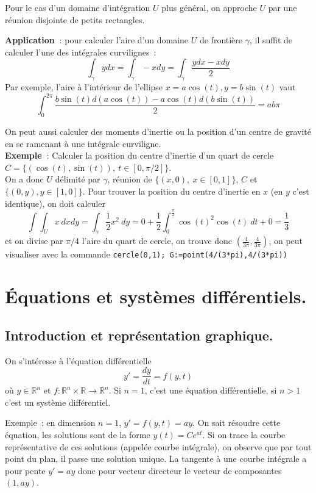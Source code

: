 \documentclass[a4paper,11pt]{article}
\newcommand{\R}{{\mathbb{R}}}
\begin{document}
Pour le cas d'un domaine d'int\'egration $U$ plus g\'en\'eral, on approche $U$
par une r\'eunion disjointe de petits rectangles.

{\bf Application~}: pour calculer l'aire d'un domaine $U$ de fronti\`ere
$\gamma$,  il suffit de
calculer l'une des int\'egrales curvilignes~:
$$ \int_\gamma y dx= \int_\gamma -x dy = \int_\gamma \frac{y dx - x
  dy}{2}$$
Par exemple, l'aire \`a l'int\'erieur de l'ellipse $x=a\cos(t),
y=b\sin(t)$ vaut
$$ \int_0^{2\pi} \frac{b \sin(t) d(a\cos(t)) - a\cos(t)
  d(b\sin(t))}{2} = ab\pi $$

On peut aussi calculer des moments d'inertie 
ou la position d'un centre de gravit\'e
en se ramenant \`a une int\'egrale curviligne.\\
{\bf Exemple~}: Calculer la position du centre d'inertie d'un quart
de cercle $C=\{(\cos(t),\sin(t)), \ t \in [0,\pi/2]\}$.\\
On a donc $U$ d\'elimit\'e par $\gamma$, r\'eunion de $\{(x,0), \ x
\in [0,1]\} $, $C$ et $\{(0,y), y \in [1,0]\}$.
Pour trouver la position du centre
d'inertie en $x$ (en $y$ c'est identique), on doit calculer
$$ \int \int_U x \ dx dy = \int_\gamma \frac12 x^2 \ dy
= 0 + \frac12 \int_0^{\frac{\pi}{2}} \cos(t)^2 \cos(t) \ dt + 0= \frac13$$
et on divise par $\pi/4$ l'aire du quart de cercle, on trouve
donc $(\frac{4}{3\pi},\frac{4}{3\pi})$, on peut visualiser avec
la commande \verb|cercle(0,1); G:=point(4/(3*pi),4/(3*pi))|

\section{\'Equations et syst\`emes diff\'erentiels.} \label{sec:ode}

\subsection{Introduction et repr\'esentation graphique.}
On s'int\'eresse \`a l'\'equation diff\'erentielle
\begin{equation} \label{eq:diff}
 y'=\frac{dy}{dt}=f(y,t)
\end{equation}
o\`u $y \in \R^n$ et $f: \R^n \times \R \rightarrow \R^n$.
Si $n=1$, c'est une \'equation diff\'erentielle, si $n>1$ c'est
un syst\`eme diff\'erentiel.

Exemple~: en dimension $n=1$, $y'=f(y,t)=ay$. On sait r\'esoudre cette
\'equation, les solutions sont de la forme $y(t)=Ce^{at}$. Si on trace
la courbe repr\'esentative de ces solutions (appel\'ee
courbe int\'egrale), on observe que par
tout point du plan, il passe une solution unique. La tangente
\`a une courbe int\'egrale a pour pente $y'=ay$ donc pour
vecteur directeur le vecteur de composantes $(1,ay)$.
\end{document}
